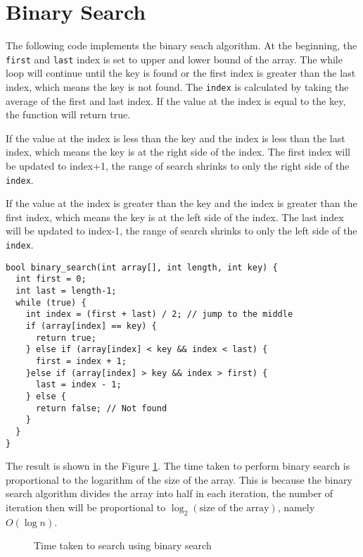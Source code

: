 \documentclass[a4paper,11pt]{article}
\begin{document}
\section*{Binary Search}

The following code implements the binary seach algorithm. At the beginning, the {\tt first}
and {\tt last} index is set to upper and lower bound of the array.
The while loop will continue until the key is found or the first index is greater 
than the last index, which means the key is not found.
The {\tt index} is calculated by taking the average of the first and 
last index. If the value at the index is equal to the key, the function will return 
true. 

If the value at the index is less than the key and the index is less than the 
last index, which means the key is at the right side of the index.
The first index will be updated to index+1, the range of search shrinks to only
the right side of the {\tt index}.

If the value at the index is greater than the key and the index is greater than 
the first index, which means the key is at the left side of the index.
The last index will be updated to index-1, the range of search shrinks to only
the left side of the {\tt index}.

\begin{verbatim}
bool binary_search(int array[], int length, int key) {
  int first = 0;
  int last = length-1;
  while (true) {
    int index = (first + last) / 2; // jump to the middle
    if (array[index] == key) {
      return true;
    } else if (array[index] < key && index < last) {
      first = index + 1;
    }else if (array[index] > key && index > first) {
      last = index - 1;
    } else {
      return false; // Not found
    }
  }
}
\end{verbatim}

The result is shown in the Figure \ref{fig:binary_search}. 
The time taken to perform binary search is proportional to the logarithm of the 
size of the array. This is because the binary search algorithm divides 
the array into half in each iteration, the number of iteration then will be 
proportional to $\log_{2}(\text{size of the array})$, namely $O(\log n)$.

\begin{figure}[H]
  \centering
  \caption{Time taken to search using binary search}
  \label{fig:binary_search}
\end{figure}
\end{document}
